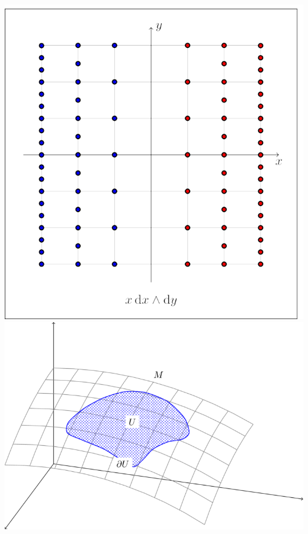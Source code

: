 \documentclass[20pt,margin=1in,innermargin=-4.5in,blockverticalspace=-0.25in]{tikzposter}
\begin{document}
\begin{columns}
{\begin{center}
                \includegraphics[scale=0.3]{xdxdyform.png} \quad
                \includegraphics[scale=0.3]{atom-manifolds.png}\quad

\end{center}}
\end{columns}
\end{document}
